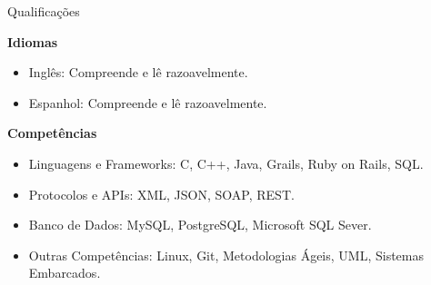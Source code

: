 \documentclass{resume} %
\begin{document}

\begin{rSection}{Qualificações}

\textbf{Idiomas}
\begin{itemize}
	\item Inglês: Compreende e lê razoavelmente.
	\item Espanhol: Compreende e lê razoavelmente.
\end{itemize}

\textbf{Competências}
\begin{itemize}
	\item Linguagens e Frameworks: C, C++, Java, Grails, Ruby on Rails, SQL.
	\item Protocolos e APIs: XML, JSON, SOAP, REST.
	\item Banco de Dados: MySQL, PostgreSQL, Microsoft SQL Sever.
	\item Outras Competências: Linux, Git, Metodologias Ágeis, UML, Sistemas Embarcados.
\end{itemize}

\end{rSection}
\end{document}

